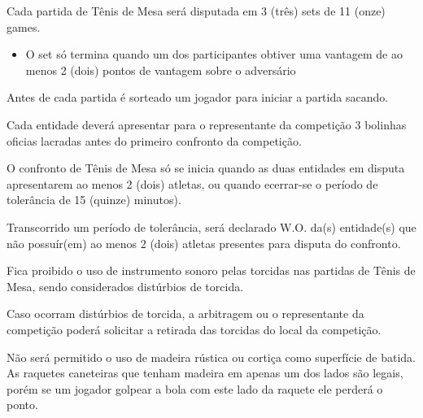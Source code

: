 \noindent
Cada partida de Tênis de Mesa será disputada em 3 (três) sets de 11 (onze) games.
\begin{itemize}[noitemsep]
	\item O set só termina quando um dos participantes obtiver uma vantagem de ao menos 2 (dois) pontos de vantagem sobre o adversário
\end{itemize}

\noindent
Antes de cada partida é sorteado um jogador para iniciar a partida sacando.

\begin{article}
	Cada entidade deverá apresentar para o representante da competição 3 bolinhas oficias lacradas antes do primeiro confronto da competição.
\end{article}

\begin{article}
	O confronto de Tênis de Mesa só se inicia quando as duas entidades em disputa apresentarem ao menos 2 (dois) atletas, ou quando ecerrar-se o período de tolerância de 15 (quinze) minutos).

	\begin{xparagraph}
		Transcorrido um período de tolerância, será declarado W.O. da(s) entidade(s) que não possuír(em) ao menos 2 (dois) atletas presentes para disputa do confronto.
	\end{xparagraph}
\end{article}

\begin{article}
	Fica proibido o uso de instrumento sonoro pelas torcidas nas partidas de Tênis de Mesa, sendo considerados distúrbios de torcida.

	\begin{xparagraph}
		Caso ocorram distúrbios de torcida, a arbitragem ou o representante da competição poderá solicitar a retirada das torcidas do local da competição.
	\end{xparagraph}
\end{article}

\begin{article}
	Não será permitido o uso de madeira rústica ou cortiça como superfície de batida. As raquetes caneteiras que tenham madeira em apenas um dos lados são legais, porém se um jogador golpear a bola com este lado da raquete ele perderá o ponto.
\end{article}
